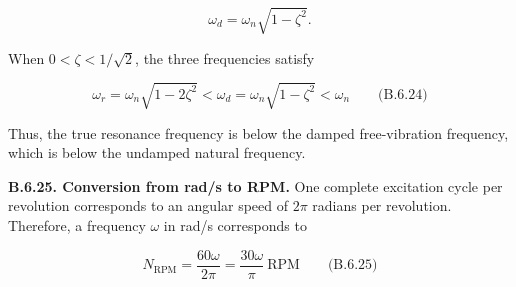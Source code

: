 \[
\omega_d=\omega_n\sqrt{1-\zeta^2}.
\]

When $0<\zeta<1/\sqrt{2}$, the three frequencies satisfy

\[
\boxed{\omega_r=\omega_n\sqrt{1-2\zeta^2}
<\omega_d=\omega_n\sqrt{1-\zeta^2}<\omega_n}
\qquad\text{(B.6.24)}
\]

Thus, the true resonance frequency is below the damped free-vibration frequency, which is below the undamped natural frequency.

\textbf{B.6.25. Conversion from rad/s to RPM.} One complete excitation cycle per revolution corresponds to an angular speed of $2\pi$ radians per revolution. Therefore, a frequency $\omega$ in rad/s corresponds to

\[
\boxed{N_{\mathrm{RPM}}=\frac{60\omega}{2\pi}=\frac{30\omega}{\pi}\ \mathrm{RPM}}
\qquad\text{(B.6.25)}
\]

\endgroup
